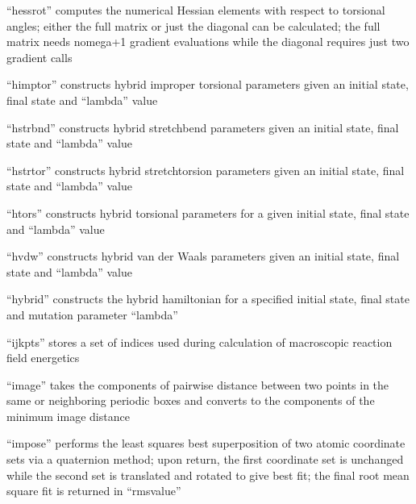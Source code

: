 \documentclass[letterpaper,11pt,english]{sphinxmanual}
\begin{document}
“hessrot” computes the numerical Hessian elements with respect to torsional angles; either the full matrix or just the diagonal can be calculated; the full matrix needs nomega+1 gradient evaluations while the diagonal requires just two gradient calls


“himptor” constructs hybrid improper torsional parameters given an initial state, final state and “lambda” value


“hstrbnd” constructs hybrid stretch\sphinxhyphen{}bend parameters given an initial state, final state and “lambda” value


“hstrtor” constructs hybrid stretch\sphinxhyphen{}torsion parameters given an initial state, final state and “lambda” value


“htors” constructs hybrid torsional parameters for a given initial state, final state and “lambda” value


“hvdw” constructs hybrid van der Waals  parameters given an initial state, final state and “lambda” value


“hybrid” constructs the hybrid hamiltonian for a specified initial state, final state and mutation parameter “lambda”


“ijkpts” stores a set of indices used during calculation of macroscopic reaction field energetics


“image” takes the components of pairwise distance between two points in the same or neighboring periodic boxes and converts to the components of the minimum image distance


“impose” performs the least squares best superposition of two atomic coordinate sets via a quaternion method; upon return, the first coordinate set is unchanged while the second set is translated and rotated to give best fit; the final root mean square fit is returned in “rmsvalue”
\end{document}
